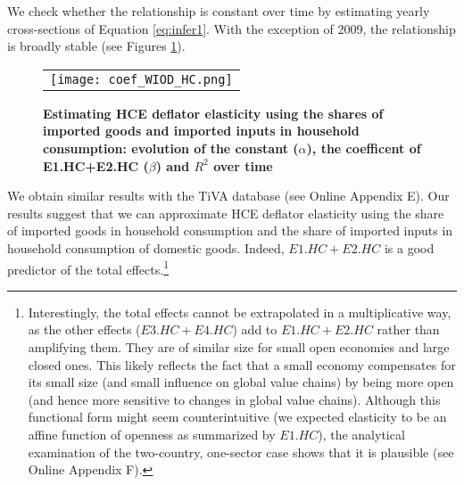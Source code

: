 \documentclass[11pt,a4paper]{paper} %
\begin{document}
We check whether the relationship is constant over time by estimating yearly cross-sections of Equation \ref{eq:infer1}. 
With the exception of 2009, the relationship is broadly stable (see Figures \ref{fig:evolution_coef}).

\begin{figure}[H]
\centering
\caption{\footnotesize{\textbf{Estimating HCE deflator elasticity using the shares of imported goods and imported inputs in household consumption: evolution of the constant ($\alpha$), the coefficent of E1.HC+E2.HC ($\beta$) and $R^2$ over time}}}
\begin{tabular}{c}
\texttt{[image: coef\_WIOD\_HC.png]}\\
\end{tabular}
\label{fig:evolution_coef}
\end{figure}

We obtain similar results with the TiVA database (see Online Appendix E). 
Our results suggest that we can approximate HCE deflator elasticity using the share of imported goods in household consumption and the share of imported inputs in household consumption of domestic goods. Indeed, $E1.HC+E2.HC$ is a good predictor of the total effects.\footnote{Interestingly, the total effects cannot be extrapolated in a multiplicative way, as the other effects ($E3.HC+E4.HC$) add to $E1.HC+E2.HC$ rather than amplifying them.
They are of similar size for small open economies and large closed ones.
This likely reflects the fact that a small economy compensates for its small size (and small influence on global value chains) by being more open (and hence more sensitive to changes in global value chains). Although this functional form might seem counterintuitive (we expected elasticity to be an affine function of openness as summarized by $E1.HC$), the analytical examination of the two-country, one-sector case shows that it is plausible (see Online Appendix F).}
\end{document}
